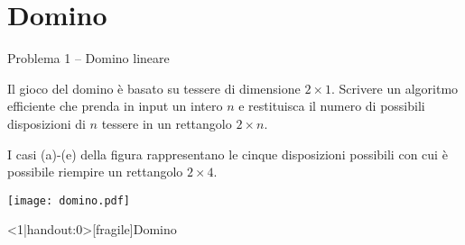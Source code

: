 \section{Domino}

\begin{frame}{Problema 1 -- Domino lineare}

\vspace{-9pt}
\begin{myboxtitle}[Definizione]
Il gioco del domino è basato su tessere di dimensione $2 \times 1$. Scrivere
un algoritmo efficiente che prenda in input un intero $n$ e restituisca il numero di possibili disposizioni di $n$ tessere in un rettangolo $2 \times n$.
\end{myboxtitle}

\begin{myboxtitle}[Esempio]
I casi (a)-(e) della figura rappresentano le cinque disposizioni possibili con cui è possibile riempire un rettangolo $2 \times 4$. 
\end{myboxtitle}

\begin{center}
\texttt{[image: domino.pdf]}
\end{center}

\end{frame}


\begin{frame}<1|handout:0>[fragile]{Domino}

\vspace{-9pt}

\end{frame}

